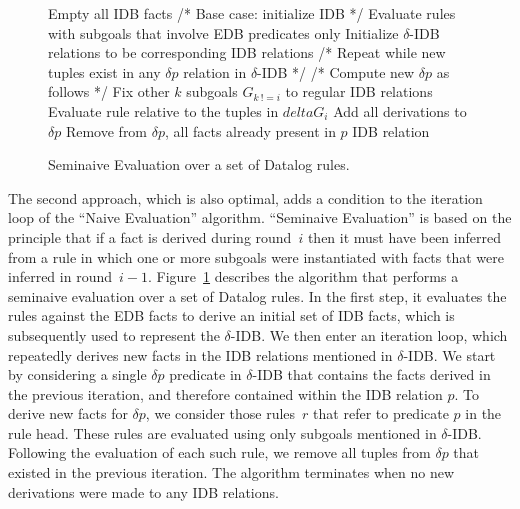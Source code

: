 \begin{figure}
\ssp
\begin{boxedminipage}{\linewidth}
    \begin{algorithmic}[1]
      	\STATE Empty all IDB facts
	\STATE /* Base case: initialize IDB */
        \STATE Evaluate rules with subgoals that involve EDB predicates only
	\STATE Initialize $\delta$-IDB relations to be corresponding IDB relations
	\STATE /* Repeat while new tuples exist in any $\delta p$ relation in $\delta$-IDB */
                	\STATE /* Compute new $\delta p$ as follows */
				\STATE Fix other $k$ subgoals $G_{k\ != i}$ to regular IDB relations
				\STATE Evaluate rule relative to the tuples in $delta G_i$ 
				\STATE Add all derivations to $\delta p$
			\ENDFOR
        	\ENDFOR
		\STATE Remove from $\delta p$, all facts already present in $p$ IDB relation
        \ENDFOR
	\ENDWHILE
    \end{algorithmic}
\end{boxedminipage}
\caption{\label{ch:p2:fig:seminaive}Seminaive Evaluation over a set of Datalog rules.}
\end{figure}

The second approach, which is also optimal, adds a condition to the iteration
loop of the ``Naive Evaluation'' algorithm.  ``Seminaive Evaluation'' is based
on the principle that if a fact is derived during round~$i$ then it must have
been inferred from a rule in which one or more subgoals were instantiated with
facts that were inferred in round~$i-1$.  Figure~\ref{ch:p2:fig:seminaive}
describes the algorithm that performs a seminaive evaluation over a set of
Datalog rules.  In the first step, it evaluates the rules against the EDB facts
to derive an initial set of IDB facts, which is subsequently used to represent
the $\delta$-IDB.  We then enter an iteration loop, which repeatedly derives
new facts in the IDB relations mentioned in $\delta$-IDB.  We start by
considering a single $\delta p$ predicate in $\delta$-IDB that contains the
facts derived in the previous iteration, and therefore contained within the IDB
relation $p$.  To derive new facts for $\delta p$, we consider those rules~$r$
that refer to predicate $p$ in the rule head.  These rules are evaluated using
only subgoals mentioned in $\delta$-IDB.  Following the evaluation of each such
rule, we remove all tuples from $\delta p$ that existed in the previous
iteration.  The algorithm terminates when no new derivations were made to any
IDB relations.


